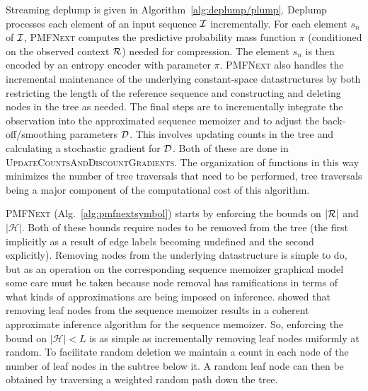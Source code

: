 Streaming deplump is given in Algorithm~\ref{alg:deplump/plump}.  Deplump processes each element of an input sequence $\IS$ incrementally.  For each element $s_n$ of $\IS$, \textsc{PMFNext} computes the predictive probability mass function $\pi$ (conditioned on the observed context $\RS$) needed for compression.  The element $s_n$ is then encoded by an entropy encoder with parameter $\pi$.  \textsc{PMFNext} also handles the incremental maintenance of the underlying constant-space datastructures by both restricting the length of the reference sequence and constructing and deleting nodes in the tree as needed.  The final steps are to incrementally integrate the observation into the approximated sequence memoizer and to adjust the back-off/smoothing parameters $\D$.  This involves updating counts in the tree and calculating a stochastic gradient for $\D$.  Both of these are done in \textsc{UpdateCountsAndDiscountGradients}. %
The organization of functions in this way minimizes the number of tree traversals that need to be performed, tree traversals being a major component of the computational cost of this algorithm.

\textsc{PMFNext} (Alg.~\ref{alg:pmfnextsymbol}) starts by enforcing the bounds on $|\RS|$ and $|\mathcal{H}|$.  Both of these bounds require nodes to be removed from the tree (the first implicitly as a result of edge labels becoming undefined and the second explicitly).  Removing nodes from the underlying datastructure is simple to do, but as an operation on the corresponding sequence memoizer graphical model some care must be taken because node removal has ramifications in terms of what kinds of approximations are being imposed on inference.  \cite{Bartlett2010} showed that removing leaf nodes from the sequence memoizer results in a coherent approximate inference algorithm for the sequence memoizer.  So, enforcing the bound on $| \mathcal{H} | < L$ is as simple as incrementally removing leaf nodes uniformly at random.  To facilitate random deletion we maintain a count in each node of the number of leaf nodes in the subtree below it.  A random leaf node can then be obtained by traversing a weighted random path down the tree.  


